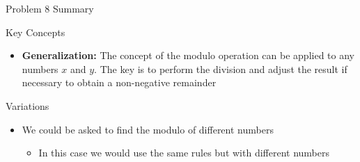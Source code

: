 \begin{summary}{Problem 8 Summary}
\begin{statement}{Key Concepts}
\begin{itemize}
            \item \textbf{Generalization:} The concept of the modulo operation can be applied to any numbers $x$ and $y$. The key is to perform the division and adjust the result if necessary to obtain 
            a non-negative remainder
        \end{itemize}
    \end{statement}
    \begin{statement}{Variations}
        \begin{itemize}
            \item We could be asked to find the modulo of different numbers
            \begin{itemize}
                \item In this case we would use the same rules but with different numbers
            \end{itemize}
        \end{itemize}
    \end{statement}
\end{summary}

